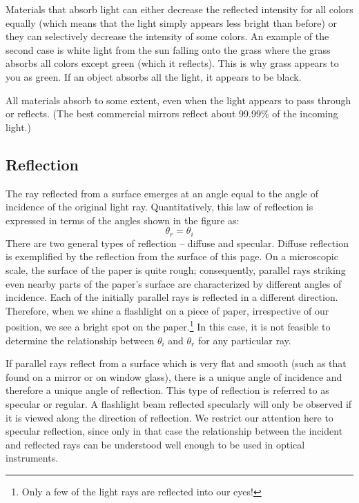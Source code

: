 Materials that absorb light can either decrease the reflected intensity for all colors equally (which means that the light simply appears less bright than before) or they can selectively decrease the intensity of some colors. An example of the second case is white light from the sun falling onto the grass where the grass absorbs all colors except green (which it reflects). This is why grass appears to you as green. If an object absorbs all the light, it appears to be black.\myskip

All materials absorb to some extent, even when the light appears to pass through or reflects. (The best commercial mirrors reflect about 99.99\% of the incoming light.)

\subsection{Reflection}

The ray reflected from a surface emerges at an angle equal to the angle of incidence of the original light ray.  Quantitatively, this law of reflection is expressed in terms of the angles shown in the figure as:
\begin{equation}
    \theta_{r} = \theta_{i}
\end{equation}
There are two general types of reflection -- diffuse and specular. Diffuse reflection is exemplified by the reflection from the surface of this page. On a microscopic scale, the surface of the paper is quite rough; consequently, parallel rays striking even nearby parts of the paper's surface are characterized by different angles of incidence. Each of the initially parallel rays is reflected in a different direction.  Therefore, when we shine a flashlight on a piece of paper, irrespective of our position, we see a bright spot on the paper.\footnote{Only a few of the light rays are reflected into our eyes!}  In this case, it is not feasible to determine the relationship between $\theta_{i}$ and $\theta_{r}$ for any particular ray.\myskip

If parallel rays reflect from a surface which is very flat and smooth (such as that found on a mirror or on window glass), there is a unique angle of incidence and therefore a unique angle of reflection. This type of reflection is referred to as specular or regular. A flashlight beam reflected specularly will only be observed if it is viewed along the direction of reflection. We restrict our attention here to specular reflection, since only in that case the relationship between the incident and reflected rays can be understood well enough to be used in optical instruments.  \myskip

